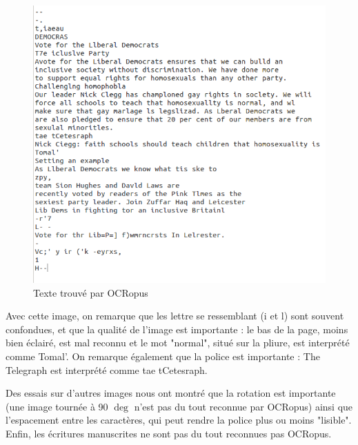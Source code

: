 	\begin{figure}[H]
		\centering
		\includegraphics[scale=0.6]{images/FJEZNU_result.png}
		\caption{Texte trouvé par OCRopus}
		\label{fig:resultat}
	\end{figure}

	Avec cette image, on remarque que les lettre se ressemblant (i et l) sont souvent confondues, et que la qualité de l'image est importante : le bas de la page, moins bien éclairé, est mal reconnu et le mot "normal", situé sur la pliure, est interprété comme Tomal'. On remarque également que la police est importante : The Telegraph est interprété comme tae tCetesraph.

	Des essais sur d'autres images nous ont montré que la rotation est importante (une image tournée à 90 $\deg$ n'est pas du tout reconnue par OCRopus) ainsi que l'espacement entre les caractères, qui peut rendre la police plus ou moins "lisible". Enfin, les écritures manuscrites ne sont pas du tout reconnues pas OCRopus.

